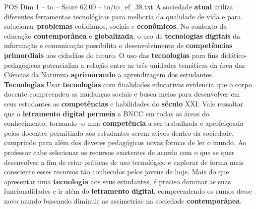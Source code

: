 \begin{textsample}{POS Dim 1 – to – Score 62.00 – to/to\_ef\_38.txt}
A sociedade \textbf{atual} utiliza diferentes ferramentas tecnológicas para melhoria da qualidade de vida e para solucionar \textbf{problemas} cotidianos, sociais e \textbf{econômicos}.
No contexto da educação \textbf{contemporânea} e \textbf{globalizada}, o uso de \textbf{tecnologias} \textbf{digitais} da informação e comunicação possibilita o desenvolvimento de \textbf{competências} \textbf{primordiais} aos cidadãos do futuro.
O uso das \textbf{tecnologias} para fins didático-pedagógicos potencializa a relação entre as três unidades temáticas da área das Ciências da Natureza \textbf{aprimorando} a aprendizagem dos estudantes. \textbf{Tecnologias} Usar \textbf{tecnologias} com finalidades educativas evidencia que o corpo docente compreendeu as mudanças sociais e busca meios para desenvolver em seus estudantes as \textbf{competências} e habilidades do \textbf{século} XXI.
Vale ressaltar que o \textbf{letramento} \textbf{digital} \textbf{permeia} a BNCC em todas as áreas do conhecimento, tornando -o uma \textbf{competência} a ser trabalhada e aperfeiçoada pelos docentes permitindo aos estudantes serem ativos dentro da sociedade, cumprindo para além dos deveres pedagógicos novas formas de ler o mundo.
Ao professor cabe selecionar os recursos existentes de acordo com o que se quer desenvolver a fim de criar práticas de uso tecnológico e explorar de forma mais consciente esses recursos tão conhecidos pelos jovens de hoje.
Mais do que apresentar uma \textbf{tecnologia} aos seus estudantes, é preciso dominar as suas funcionalidades e ir além do \textbf{letramento} \textbf{digital}, compreendendo os rumos desse novo mundo buscando diminuir as assimetrias na sociedade \textbf{contemporânea}.

\end{textsample}
